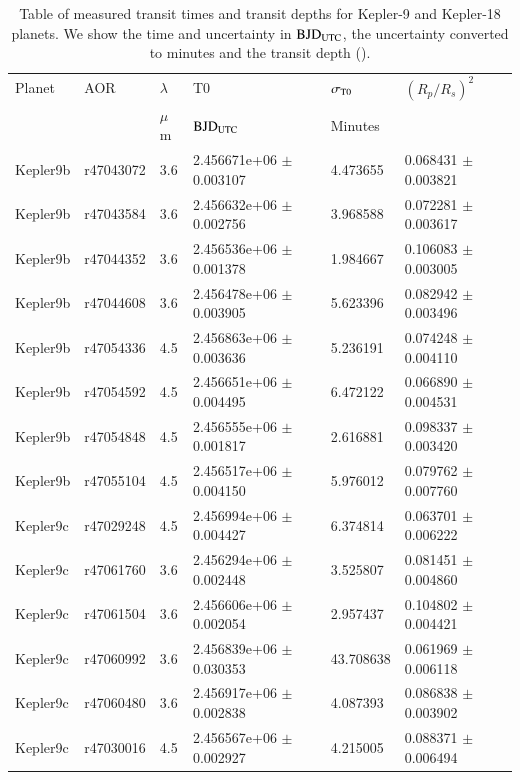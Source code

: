 \begin{subappendices}
\begin{table}
  \setlength{\tabcolsep}{3pt}
    \centering
        \caption{Table of measured transit times and transit depths for Kepler-9 and Kepler-18 planets. We show the time and uncertainty in $\rm BJD_{UTC}$, the uncertainty converted to minutes and the transit depth (\rprss). }
    \begin{tabular}{llllll}
    \hline\hline
Planet & AOR & $\lambda$ &  T0 &   $\sigma_{\rm T0}$  & $(R_p/R_s)^2$ \\
& & $\mu$m & $\rm BJD_{UTC}$ & Minutes &  \\
\hline
Kepler9b &  r47043072 &     3.6 &  2.456671e+06 $\pm$ 0.003107 &    4.473655 &  0.068431 $\pm$ 0.003821 \\
Kepler9b &  r47043584 &     3.6 &  2.456632e+06 $\pm$ 0.002756 &    3.968588 &  0.072281 $\pm$ 0.003617 \\
Kepler9b &  r47044352 &     3.6 &  2.456536e+06 $\pm$ 0.001378 &    1.984667 &  0.106083 $\pm$ 0.003005 \\
Kepler9b &  r47044608 &     3.6 &  2.456478e+06 $\pm$ 0.003905 &    5.623396 &  0.082942 $\pm$ 0.003496 \\
Kepler9b &  r47054336 &     4.5 &  2.456863e+06 $\pm$ 0.003636 &    5.236191 &  0.074248 $\pm$ 0.004110 \\
Kepler9b &  r47054592 &     4.5 &  2.456651e+06 $\pm$ 0.004495 &    6.472122 &  0.066890 $\pm$ 0.004531 \\
Kepler9b &  r47054848 &     4.5 &  2.456555e+06 $\pm$ 0.001817 &    2.616881 &  0.098337 $\pm$ 0.003420 \\
Kepler9b &  r47055104 &     4.5 &  2.456517e+06 $\pm$ 0.004150 &    5.976012 &  0.079762 $\pm$ 0.007760 \\
Kepler9c &  r47029248 &     4.5 &  2.456994e+06 $\pm$ 0.004427 &    6.374814 &  0.063701 $\pm$ 0.006222 \\
Kepler9c &  r47061760 &     3.6 &  2.456294e+06 $\pm$ 0.002448 &    3.525807 &  0.081451 $\pm$ 0.004860 \\
Kepler9c &  r47061504 &     3.6 &  2.456606e+06 $\pm$ 0.002054 &    2.957437 &  0.104802 $\pm$ 0.004421 \\
Kepler9c &  r47060992 &     3.6 &  2.456839e+06 $\pm$ 0.030353 &   43.708638 &  0.061969 $\pm$ 0.006118 \\
Kepler9c &  r47060480 &     3.6 &  2.456917e+06 $\pm$ 0.002838 &    4.087393 &  0.086838 $\pm$ 0.003902 \\
Kepler9c &  r47030016 &     4.5 &  2.456567e+06 $\pm$ 0.002927 &    4.215005 &  0.088371 $\pm$ 0.006494 \\

\end{tabular}
\end{table}
\end{subappendices}
